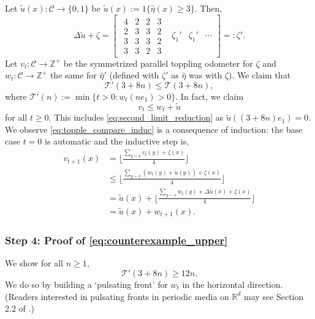 \documentclass[aap]{imsart}
\newcommand{\R}{\mathbb{R}}
\newcommand{\Z}{\mathbb{Z}}
\begin{document}
Let $\tilde{u}(x): \mathcal{C} \to \{0 ,1\}$ be  $\tilde{u}(x) := 1 \{ \hat{\eta}(x) \geq 3\}$.
Then, 
\[
\Delta \tilde{u} + \zeta
=
\begin{bmatrix}
\begin{matrix}
4 & 2 & 2 & 3 \\
2 & 3 & 3 & 2 \\
3 & 3 & 3 & 2 \\
3 & 3 & 2 & 3 
\end{matrix}
& \zeta_1' & \zeta_1' & \cdots 
\end{bmatrix}
=: \zeta'.
\]
Let $v_t: \mathcal{C} \to \Z^+$ be the symmetrized parallel toppling odometer for $\zeta$ and $w_t:\mathcal{C} \to \Z^+$ the
same for $\hat{\eta}'$ (defined with $\zeta'$ as $\hat{\eta}$ was with $\zeta$). We claim that 
\begin{equation} \label{eq:second_limit_reduction}
\mathcal{T}'(3 + 8n) \leq \mathcal{T}(3 + 8 n), 
\end{equation}
where $\mathcal{T}'(n) := \min\{t > 0 : w_t(n e_1) > 0\}$.
In fact, we claim
\begin{equation} \label{eq:topple_compare_induc}
v_t \leq w_t + \tilde{u}
\end{equation}
for all $t \geq 0$.  This includes \eqref{eq:second_limit_reduction} as $\tilde{u}( (3 + 8 n) e_1) = 0$. 
We observe \eqref{eq:topple_compare_induc} is a consequence of induction: the base case $t = 0$ is automatic and 
the inductive step is, 
\begin{align*}
v_{t+1}(x) &=  \lfloor \frac{\sum_{y \sim x}  v_t(y) + \zeta(x)}{4} \rfloor  \\
&\leq  \lfloor \frac{\sum_{y \sim x}  (w_t(y) + \tilde{u}(y)) + \zeta(x)}{4} \rfloor  \\
&= \tilde{u}(x) +  \lfloor \frac{\sum_{y \sim x}  w_t(y) + \Delta \tilde{u}(x) + \zeta(x)}{4} \rfloor  \\
&= \tilde{u}(x) +  w_{t+1}(x).
\end{align*}

\subsubsection*{Step 4: Proof of \eqref{eq:counterexample_upper}}
We show for all $n \geq 1$,
\begin{equation} \label{eq:second_limit_upper_bound}
\mathcal{T}'(3 + 8 n) \geq 12 n.
\end{equation}
We do so by building a `pulsating front' for $w_t$ in the horizontal direction. (Readers interested in pulsating fronts in periodic media on $\R^d$ may see Section 2.2 of \cite{xin2009introduction}.)
\end{document}

